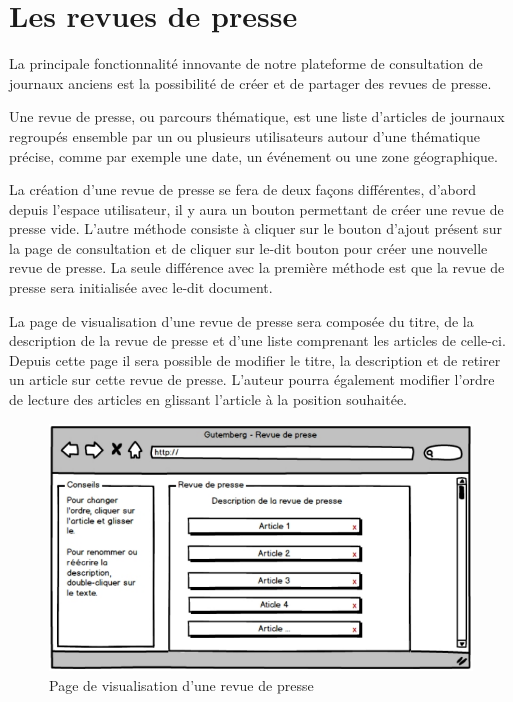 \section{Les revues de presse}
\label{sec:revue}

La principale fonctionnalité innovante de notre plateforme de consultation de journaux anciens est la possibilité de créer et de partager des revues de presse.

Une revue de presse, ou parcours thématique, est une liste d'articles de journaux regroupés ensemble par un ou plusieurs utilisateurs autour d'une thématique précise, comme par exemple une date, un événement ou une zone géographique.

La création d'une revue de presse se fera de deux façons différentes, d'abord depuis l'espace utilisateur, il y aura un bouton permettant de créer une revue de presse vide. L'autre méthode consiste à cliquer sur le bouton d'ajout présent sur la page de consultation et de cliquer sur le-dit bouton pour créer une nouvelle revue de presse. La seule différence avec la première méthode est que la revue de presse sera initialisée avec le-dit document.

La page de visualisation d'une revue de presse sera composée du titre, de la description de la revue de presse et d'une liste comprenant les articles de celle-ci. Depuis cette page il sera possible de modifier le titre, la description et de retirer un article sur cette revue de presse. L'auteur pourra également modifier l'ordre de lecture des articles en glissant l'article à la position souhaitée.

\begin{figure}[H]
    \centering
    \includegraphics[width=\textwidth]{figures/revue.png}
    \caption{Page de visualisation d'une revue de presse}
    \label{fig:revue}
\end{figure}

